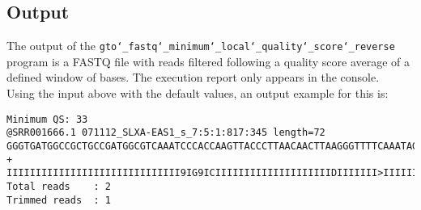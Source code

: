 \subsection*{Output}
The output of the \texttt{gto\char`_fastq\char`_minimum\char`_local\char`_quality\char`_score\char`_reverse} program is a FASTQ file with reads filtered following a quality score average of a defined window of bases.
The execution report only appears in the console.\\
Using the input above with the default values, an output example for this is:
\begin{lstlisting}
Minimum QS: 33
@SRR001666.1 071112_SLXA-EAS1_s_7:5:1:817:345 length=72
GGGTGATGGCCGCTGCCGATGGCGTCAAATCCCACCAAGTTACCCTTAACAACTTAAGGGTTTTCAAATAGA
+
IIIIIIIIIIIIIIIIIIIIIIIIIIIIII9IG9ICIIIIIIIIIIIIIIIIIIIIDIIIIIII>IIIIII/
Total reads    : 2
Trimmed reads  : 1
\end{lstlisting}